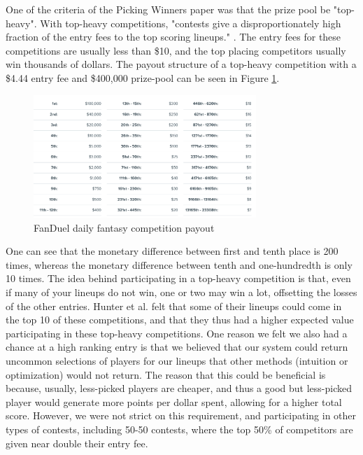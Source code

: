 One of the criteria of the Picking Winners paper was that the prize pool be "top-heavy". With top-heavy competitions, "contests give a disproportionately high fraction of the entry fees to the top scoring lineups." \cite{picking_winners}. The entry fees for these competitions are usually less than \$10, and the top placing competitors usually win thousands of dollars. The payout structure of a top-heavy competition with a \$4.44 entry fee and \$400,000 prize-pool can be seen in Figure \ref{fig:comp_payout}.

\begin{figure}[ht]
    \centering
    \includegraphics[width=0.75\textwidth]{figures/fantasy_competition_payout}
    \caption{FanDuel daily fantasy competition payout}
    \label{fig:comp_payout}
\end{figure}

One can see that the monetary difference between first and tenth place is 200 times, whereas the monetary difference between tenth and one-hundredth is only 10 times. The idea behind participating in a top-heavy competition is that, even if many of your lineups do not win, one or two may win a lot, offsetting the losses of the other entries. Hunter  et al. \cite{picking_winners} felt that some of their lineups could come in the top 10 of these competitions, and that they thus had a higher expected value participating in these top-heavy competitions. One reason we felt we also had a chance at a high ranking entry is that we believed that our system could return uncommon selections of players for our lineups that other methods (intuition or optimization) would not return. The reason that this could be beneficial is because, usually, less-picked players are cheaper, and thus a good but less-picked player would generate more points per dollar spent, allowing for a higher total score. However, we were not strict on this requirement, and participating in other types of contests, including 50-50 contests, where the top 50\% of competitors are given near double their entry fee.

